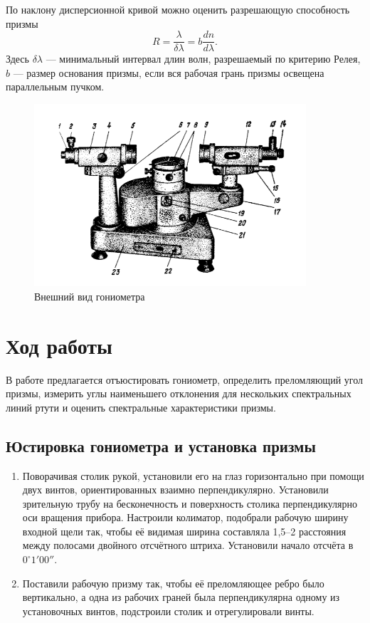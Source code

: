 \documentclass[a4paper,12pt]{article}
\begin{document}
	По наклону дисперсионной кривой можно оценить разрешающую
	способность призмы
	\begin{equation}
	R = \dfrac{\lambda}{\delta\lambda} = b\dfrac{dn}{d\lambda}.
	\end{equation}
	Здесь $\delta\lambda$ --- минимальный интервал длин волн, разрешаемый по критерию Релея, $b$ --- размер основания призмы, если вся рабочая грань призмы освещена параллельным пучком.
	
		\begin{figure}[h]
		\begin{center}
			\includegraphics[width = 0.9\textwidth]{443-2.png}
			\caption{Внешний вид гониометра}
		\end{center}
	\end{figure}
	
	\section*{Ход работы}
	В работе предлагается отъюстировать гониометр, определить преломляющий угол призмы, измерить углы наименьшего отклонения для нескольких спектральных линий ртути и оценить спектральные характеристики призмы.
	\subsection*{Юстировка гониометра и установка призмы}
	\begin{enumerate}
		\item Поворачивая столик рукой, установили его на глаз горизонтально при помощи двух винтов, ориентированных взаимно перпендикулярно. Установили зрительную трубу на бесконечность и поверхность столика перпендикулярно оси вращения прибора. Настроили колиматор, подобрали рабочую ширину входной щели так, чтобы её видимая ширина составляла 1,5–2 расстояния между полосами двойного отсчётного штриха. Установили начало отсчёта в $0^\circ1'00''$.
		
		\item Поставили рабочую призму так, чтобы её преломляющее ребро было вертикально, а одна из рабочих граней была перпендикулярна одному из установочных винтов, подстроили столик и отрегулировали винты.
	\end{enumerate}
	
\end{document}
